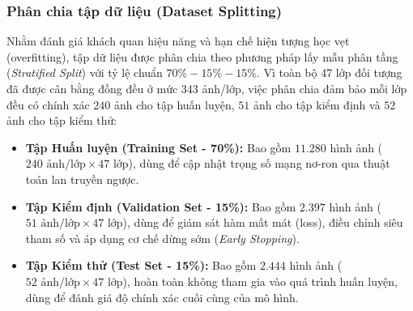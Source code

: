\subsubsection{Phân chia tập dữ liệu (Dataset Splitting)}
Nhằm đánh giá khách quan hiệu năng và hạn chế hiện tượng học vẹt (overfitting), tập dữ liệu được phân chia theo phương pháp lấy mẫu phân tầng (\textit{Stratified Split}) với tỷ lệ chuẩn $70\% - 15\% - 15\%$. Vì toàn bộ 47 lớp đối tượng đã được cân bằng đồng đều ở mức 343 ảnh/lớp, việc phân chia đảm bảo mỗi lớp đều có chính xác $240$ ảnh cho tập huấn luyện, $51$ ảnh cho tập kiểm định và $52$ ảnh cho tập kiểm thử:
\begin{itemize}[leftmargin=0.8cm, label=\textbullet, itemsep=2pt, topsep=2pt]
    \item \textbf{Tập Huấn luyện (Training Set - 70\%):} Bao gồm $11.280$ hình ảnh ($240\text{ ảnh/lớp} \times 47\text{ lớp}$), dùng để cập nhật trọng số mạng nơ-ron qua thuật toán lan truyền ngược.
    \item \textbf{Tập Kiểm định (Validation Set - 15\%):} Bao gồm $2.397$ hình ảnh ($51\text{ ảnh/lớp} \times 47\text{ lớp}$), dùng để giám sát hàm mất mát (loss), điều chỉnh siêu tham số và áp dụng cơ chế dừng sớm (\textit{Early Stopping}).
    \item \textbf{Tập Kiểm thử (Test Set - 15\%):} Bao gồm $2.444$ hình ảnh ($52\text{ ảnh/lớp} \times 47\text{ lớp}$), hoàn toàn không tham gia vào quá trình huấn luyện, dùng để đánh giá độ chính xác cuối cùng của mô hình.
\end{itemize}

